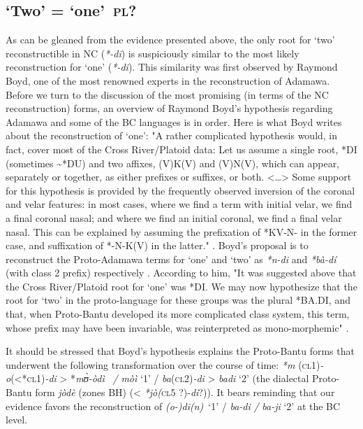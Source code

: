 \subsection{ ‘Two’ = ‘one’~\textsc{pl}?}%
As can be gleaned from the evidence presented above, the only root for ‘two’ reconstructible in NC (\textit{*-di}) is suspiciously similar to the most likely reconstruction for ‘one’ (\textit{*-di}). This similarity was first observed by Raymond Boyd, one of the most renowned experts in the reconstruction of Adamawa. Before we turn to the discussion of the most promising (in terms of the NC reconstruction) forms, an overview of Raymond Boyd’s hypothesis regarding Adamawa and some of the BC languages is in order. Here is what Boyd writes about the reconstruction of ‘one’: "A rather complicated hypothesis would, in fact, cover most of the Cross River/Platoid data: Let us assume a single root, *DI (sometimes {\textasciitilde}*DU) and two affixes, (V)K(V) and (V)N(V), which can appear, separately or together, as either prefixes or suffixes, or both. <…> Some support for this hypothesis is provided by the frequently observed inversion of the coronal and velar features: in most cases, where we find a term with initial velar, we find a final coronal nasal; and where we find an initial coronal, we find a final velar nasal. This can be explained by assuming the prefixation of *KV-N- in the former case, and suffixation of *-N-K(V) in the latter." \citep[151-152]{Boyd1989}. Boyd’s proposal is to reconstruct the Proto-Adamawa terms for ‘one’  and ‘two’ as \textit{*n-di} and \textit{*bà-dí} (with class 2 prefix) respectively \citep[156]{Boyd1989}. According to him, "It was suggested above that the Cross River/Platoid root for ‘one’ was *DI. We may now hypothesize that the root for ‘two’ in the proto-language for these groups was the plural *BA.DI, and that, when Proto-Bantu developed its more complicated class system, this term, whose prefix may have been invariable, was reinterpreted as mono-morphemic" \citep[157]{Boyd1989}. 

It should be stressed that Boyd’s hypothesis explains the Proto-Bantu forms that underwent the following transformation over the course of time: \textit{*m} (\textsc{cl}1)\textit{-o}(<*\textsc{cl}1)\textit{-di} > *\textit{m{\`{ʊ}}-òdì~} \textit{/} \textit{mòì} ‘1’ / \textit{ba}(\textsc{cl}2)\textit{-di} > \textit{badi} ‘2’ (the dialectal Proto-Bantu form \textit{jòdè} (zones BH) (< \textit{*jò(}\textsc{cl}5 ?)-\textit{di}?)). It bears reminding that our evidence favors the reconstruction of \textit{(o-)di(n)}~‘1’ / \textit{ba-di} \textit{/} \textit{ba-ji} ‘2’ at the BC level. 

